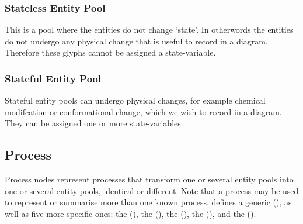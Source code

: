 \subsubsection{Stateless Entity Pool}

This is a pool where the entities do not change `state'. In otherwords
the entities do not undergo any physical change that is useful to
record in a \PD diagram. Therefore these glyphs cannot be assigned a state-variable.






\subsubsection{Stateful Entity Pool}

Stateful entity pools can undergo physical changes, for example chemical
modifcation or conformational change, which we wish to record in a \PD
diagram. They can be assigned one or more state-variables.




%
%





\subsection{Process}\label{sec:PNs}

Process nodes represent processes that transform one or several entity
pools into one or several entity pools, identical or different. Note
that a process may be used to represent or summarise more than one
known process.  \SBGNPDLone defines a generic 
(), as well as five more specific ones: the
 (), the  (), the 
(), the  (),
and the  ().

